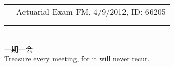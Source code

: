 \documentclass[utf8,letterpaper,oneside]{article}
\begin{document}
\begin{center}
\begin{tabular}{l l}
                         & Actuarial Exam FM, 4/9/2012, ID: 66205                                                                \\
                         &                                                                                                       \\\hline
                         &                                                                                                       \\
 \end{tabular}\\
 {\setmainfont{kaiu.ttf} 一期一会}\\
 Treasure every meeting, for it will never recur.
\end{center}
\end{document}
